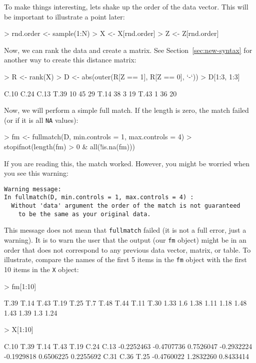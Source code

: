 \documentclass{article}
\begin{document}
To make things interesting, lets shake up the order of the data vector. This
will be important to illustrate a point later:
\begin{Schunk}
\begin{Sinput}
> rnd.order <- sample(1:N)
> X <- X[rnd.order]
> Z <- Z[rnd.order]
\end{Sinput}
\end{Schunk}

Now, we can rank the data and create a matrix. See
Section~\ref{sec:new-syntax} for another way to create this distance matrix:

\begin{Schunk}
\begin{Sinput}
> R <- rank(X)
> D <- abs(outer(R[Z == 1], R[Z == 0], `-`))
> D[1:3, 1:3]
\end{Sinput}
\begin{Soutput}
     C.10 C.24 C.13
T.39   10   45   29
T.14   38    3   19
T.43    1   36   20
\end{Soutput}
\end{Schunk}

Now, we will perform a simple full match. If the length is zero, the match
failed (or if it is all \texttt{NA} values):
\begin{Schunk}
\begin{Sinput}
> fm <- fullmatch(D, min.controls = 1, max.controls = 4)
> stopifnot(length(fm) > 0 & all(!is.na(fm)))
\end{Sinput}
\end{Schunk}

If you are reading this, the match worked. However, you might be worried when
you see this warning:
\begin{verbatim}
Warning message:
In fullmatch(D, min.controls = 1, max.controls = 4) :
  Without 'data' argument the order of the match is not guaranteed
    to be the same as your original data.
\end{verbatim}

This message does not mean that \texttt{fullmatch} failed (it is not a full
error, just a warning). It is to warn the
user that the output (our \texttt{fm} object) might be in an order that does not
correspond to any previous data vector, matrix, or table. To illustrate,
compare the names of the first 5 items in the \texttt{fm}
object with the first 10 items in the \texttt{X} object:
\begin{Schunk}
\begin{Sinput}
> fm[1:10]
\end{Sinput}
\begin{Soutput}
T.39 T.14 T.43 T.19 T.25  T.7 T.48 T.44 T.11 T.30 
1.33  1.6 1.38 1.11 1.18 1.48 1.43 1.39  1.3 1.24 
\end{Soutput}
\begin{Sinput}
> X[1:10]
\end{Sinput}
\begin{Soutput}
      C.10       T.39       T.14       T.43       T.19       C.24       C.13 
-0.2252463 -0.4707736  0.7526047 -0.2932224 -0.1929818  0.6506225  0.2255692 
      C.31       C.36       T.25 
-0.4760022  1.2832260  0.8433414 
\end{Soutput}
\end{Schunk}
\end{document}
